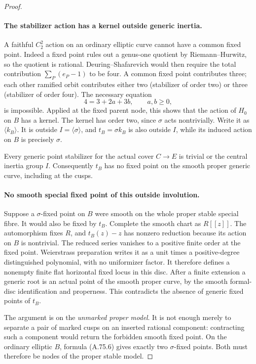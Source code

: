 \begin{proof}
\paragraph{The stabilizer action has a kernel outside generic inertia.}
A faithful \(C_2^2\) action on an ordinary elliptic curve
cannot have a common fixed point. Indeed a fixed point
rules out a genus-one quotient by Riemann--Hurwitz, so
the quotient is rational. Deuring--Shafarevich would then
require the total contribution \(\sum_P(e_P-1)\) to
be four. A common fixed point contributes three; each
other ramified orbit contributes either two (stabilizer
of order two) or three (stabilizer of order four). The
necessary equation
\[
                         4=3+2a+3b,\qquad a,b\ge0,
                                                        \tag{A.75.9}
\]
is impossible. Applied at the fixed parent node, this
shows that the action of \(H_0\) on \(B\) has a kernel.
The kernel has order two, since \(\sigma\) acts
nontrivially. Write it as \(\langle k_B\rangle\).
It is outside \(I=\langle\sigma\rangle\), and
\(t_B=\sigma k_B\) is also outside \(I\), while its
induced action on \(B\) is precisely \(\sigma\).

Every generic point stabilizer for the actual cover
\(C\to E\) is trivial or the central inertia group \(I\).
Consequently \(t_B\) has no fixed point on the smooth
proper generic curve, including at the cusps.

\paragraph{No smooth special fixed point of this outside involution.}
Suppose a \(\sigma\)-fixed point on \(B\) were smooth
on the whole proper stable special fibre. It would also
be fixed by \(t_B\). Complete the smooth chart as
\(R[[z]]\). The automorphism fixes \(R\), and
\(t_B(z)-z\) has nonzero reduction because its action
on \(B\) is nontrivial. The reduced series vanishes to
a positive finite order at the fixed point. Weierstrass
preparation writes it as a unit times a positive-degree
distinguished polynomial, with no uniformizer factor.
It therefore defines a nonempty finite flat horizontal
fixed locus in this disc.
\cite[Corollary 2.16]{fghVonk2021}
After a finite extension a generic root is an actual
point of the smooth proper curve, by the smooth formal-disc
identification and properness. This contradicts the absence
of generic fixed points of \(t_B\).

The argument is on the \emph{unmarked proper model}.
It is not enough merely to separate a pair of marked
cusps on an inserted rational component: contracting such
a component would return the forbidden smooth fixed point.
On the ordinary elliptic \(B\), formula (A.75.6) gives
exactly two \(\sigma\)-fixed points. Both must therefore
be nodes of the proper stable model.


\end{proof}
